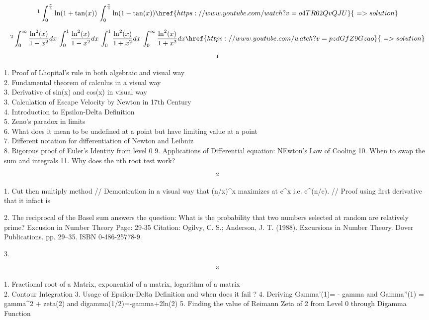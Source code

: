 \documentclass[12pt]{article}
\begin{document}
\[ \footnote{ One of them is easy and other is hard} \int_0^{\frac{\pi}{4}} \ln(1+\tan(x)) \, \int_0^{\frac{\pi}{4}} \ln(1-\tan(x)) \href{https://www.youtube.com/watch?v=o4TR62QvQJU}{\,\,=>solution}  \]

\[ \footnote { A happy get-together of integrals} \int_0^{\infty} \frac{\ln^2(x)}{1-x^2} dx \,
\int_0^{1} \frac{\ln^2(x)}{1-x^2} dx \, \int_0^{1} \frac{\ln^2(x)}{1+x^2} dx \, \int_0^{\infty} \frac{\ln^2(x)}{1+x^2} dx  \href{https://www.youtube.com/watch?v=pzdGfZ9Gzao}{\,\,=>solution}   \]

\[ \footnote{ Some cool concepts to explain}\] 
1. Proof of Lhopital's rule in both algebraic and visual way \\
2. Fundamental theorem of calculus in a visual way \\
3. Derivative of sin(x) and cos(x) in visual way \\
3. Calculation of Escape Velocity by Newton in 17th Century \\
4. Introduction to Epsilon-Delta Definition \\
5. Zeno's paradox in limits \\
6. What does it mean to be undefined at a point but have limiting value at a point \\
7. Different notation for differentiation of Newton and Leibniz \\
8. Rigorous proof of Euler's Identity from level 0
9. Applications of Differential equation: NEwton's Law of Cooling
10. When to swap the sum and integrals
11. Why does the nth root test work?

\[ \footnote{ Some concepts to use MANIM animation} \] 
1. Cut then multiply method // Demontration in a visual way that (n/x)^x maximizes at e^x i.e. e^(n/e). // Proof using first derivative that it infact is 

2. The reciprocal of the Basel sum answers the question: What is the probability that two numbers selected at random are relatively prime? Excusion in Number Theory Page: 29-35
Citation:  Ogilvy, C. S.; Anderson, J. T. (1988). Excursions in Number Theory. Dover Publications. pp. 29–35. ISBN 0-486-25778-9.

3. 

\[ \footnote { Some videos on  my Checklist} \] 
1. Fractional root of a Matrix, exponential of a matrix, logarithm of a matrix  \\
2. Contour Integration 
3. Usage of Epsilon-Delta Definition and when does it fail ?
4. Deriving Gamma'(1)= - gamma and Gamma''(1) = gamma^2 + zeta(2) and digamma(1/2)=-gamma+2ln(2) 
5. Finding the value of Reimann Zeta of 2 from Level 0 through Digamma Function 
\end{document}
